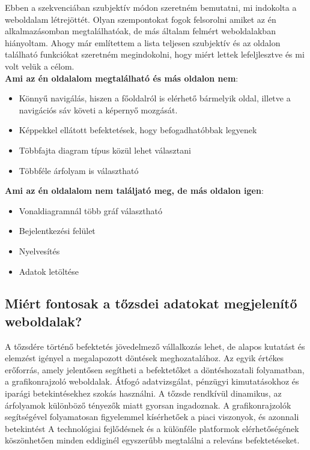 Ebben a szekvenciában szubjektív módon szeretném bemutatni, mi indokolta a weboldalam létrejöttét. Olyan szempontokat fogok felsorolni amiket az én alkalmazásomban megtalálhatóak, de más általam felmért weboldalakban hiányoltam. Ahogy már említettem a lista teljesen szubjektív és az oldalon található funkciókat szeretném megindokolni, hogy miért lettek lefeljlesztve és mi volt velük a célom. \\

\textbf{Ami az én oldalalom megtalálható és más oldalon nem}:

\begin{itemize}
\item Könnyű navigálás, hiszen a főoldalról is elérhető bármelyik oldal, illetve a navigációs sáv követi a képernyő mozgását. 
\item Képpekkel ellátott befektetések, hogy befogadhatóbbak legyenek
\item Többfajta diagram típus közül lehet választani
\item Többféle árfolyam is választható
\end{itemize}

\textbf{Ami az én oldalalom nem találjató meg, de más oldalon igen}:

\begin{itemize}
\item Vonaldiagramnál több gráf választható
\item Bejelentkezési felület
\item Nyelvesítés
\item Adatok letöltése
\end{itemize}

\subsection {Miért fontosak a tőzsdei adatokat megjelenítő weboldalak?}

A tőzsdére történő befektetés jövedelmező vállalkozás lehet, de alapos kutatást és elemzést igényel a megalapozott döntések meghozatalához. Az egyik értékes erőforrás, amely jelentősen segítheti a befektetőket a döntéshozatali folyamatban, a grafikonrajzoló weboldalak. Átfogó adatvizsgálat, pénzügyi kimutatásokhoz és iparági betekintésekhez szokás használni. A tőzsde rendkívül dinamikus, az árfolyamok különböző tényezők miatt gyorsan ingadoznak. A grafikonrajzolók segítségével folyamatosan figyelemmel kísérhetőek a piaci viszonyok, és azonnali betekintést 
A technológiai fejlődésnek és a különféle platformok elérhetőségének köszönhetően minden eddiginél egyszerűbb megtalálni a releváns befektetéseket.


